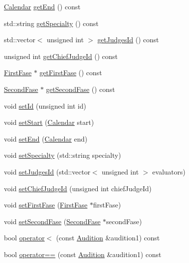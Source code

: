 \begin{DoxyCompactItemize}
\hyperlink{class_calendar}{Calendar} \hyperlink{class_audition_aed384fcdc7ec6567c102b489bcf8c6aa}{get\+End} () const
\item 
std\+::string \hyperlink{class_audition_aaa7cac841f79eec747981194046818f5}{get\+Specialty} () const
\item 
std\+::vector$<$ unsigned int $>$ \hyperlink{class_audition_a405624b42fb47c297b3e11cc7c63e209}{get\+Judges\+Id} () const
\item 
unsigned int \hyperlink{class_audition_a03c7dee223c26f5527a637f2013acceb}{get\+Chief\+Judge\+Id} () const
\item 
\hyperlink{class_first_fase}{First\+Fase} $\ast$ \hyperlink{class_audition_ada3e2914ec24b097e5ae728eb8e32470}{get\+First\+Fase} () const
\item 
\hyperlink{class_second_fase}{Second\+Fase} $\ast$ \hyperlink{class_audition_a232b0afa9a4901ecab54a97424b328e1}{get\+Second\+Fase} () const
\item 
void \hyperlink{class_audition_a2d0d263754db4ca7c99b4019a61dc6c2}{set\+Id} (unsigned int id)
\item 
void \hyperlink{class_audition_a65f617b37f5a3a65f37ad68e8a293e15}{set\+Start} (\hyperlink{class_calendar}{Calendar} start)
\item 
void \hyperlink{class_audition_add002a59ed08c058cee6635fa910380f}{set\+End} (\hyperlink{class_calendar}{Calendar} end)
\item 
void \hyperlink{class_audition_a708f47023fbf0d1d740cda888583b2bd}{set\+Specialty} (std\+::string specialty)
\item 
void \hyperlink{class_audition_a99c5d91a8d69b132fa0e35e0b88f0a1f}{set\+Judges\+Id} (std\+::vector$<$ unsigned int $>$ evaluators)
\item 
void \hyperlink{class_audition_a9a6e504bfa0ac383a13404a3a6544935}{set\+Chief\+Judge\+Id} (unsigned int chief\+Judge\+Id)
\item 
void \hyperlink{class_audition_a912e39952eba1d0caa3f256a2ae3271b}{set\+First\+Fase} (\hyperlink{class_first_fase}{First\+Fase} $\ast$first\+Fase)
\item 
void \hyperlink{class_audition_ac24a4a35667f1826ecf5e2c330ca82a7}{set\+Second\+Fase} (\hyperlink{class_second_fase}{Second\+Fase} $\ast$second\+Fase)
\item 
bool \hyperlink{class_audition_ab9ceb3af47f97b5ca6e941712edf2db0}{operator$<$} (const \hyperlink{class_audition}{Audition} \&audition1) const
\item 
bool \hyperlink{class_audition_ac0cb2b6e7de7fd30691bbea60640bd2a}{operator==} (const \hyperlink{class_audition}{Audition} \&audition1) const

\end{DoxyCompactItemize}
